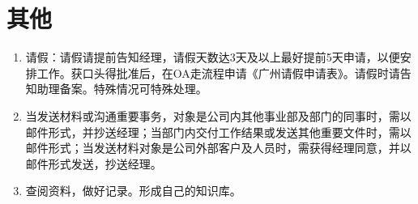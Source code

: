 \documentclass[]{book}
\begin{document}
\hypertarget{section-4}{%
\chapter{其他}\label{section-4}}

\begin{enumerate}
\def\labelenumi{\arabic{enumi}.}
\item
  请假：请假请提前告知经理，请假天数达3天及以上最好提前5天申请，以便安排工作。获口头得批准后，在OA走流程申请《广州请假申请表》。请假时请告知助理备案。特殊情况可特殊处理。
\item
  当发送材料或沟通重要事务，对象是公司内其他事业部及部门的同事时，需以邮件形式，并抄送经理；当部门内交付工作结果或发送其他重要文件时，需以邮件形式；当发送材料对象是公司外部客户及人员时，需获得经理同意，并以邮件形式发送，抄送经理。
\item
  查阅资料，做好记录。形成自己的知识库。
\end{enumerate}


\end{document}
